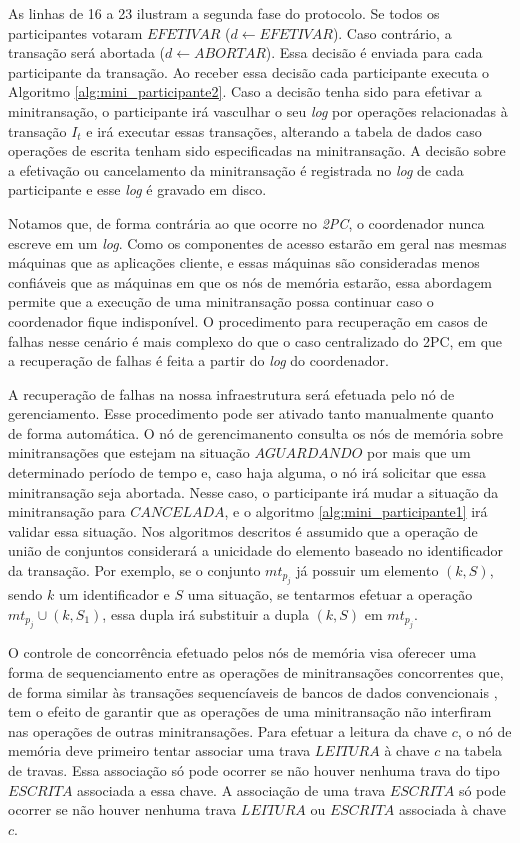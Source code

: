 \documentclass[11pt,twoside,a4paper]{book}
\begin{document}
As linhas de 16 a 23 ilustram a segunda fase do protocolo. Se todos os participantes votaram $EFETIVAR$ ($d \gets EFETIVAR$). Caso contrário, a transação será abortada ($d \gets ABORTAR$). Essa decisão é enviada para cada participante da transação. Ao receber essa decisão cada participante executa o Algoritmo \ref{alg:mini_participante2}. Caso a decisão tenha sido para efetivar a minitransação, o participante irá vasculhar o seu \emph{log} por operações relacionadas à transação $I_t$ e irá executar essas transações, alterando a tabela de dados caso operações de escrita tenham sido especificadas na minitransação. A decisão sobre a efetivação ou cancelamento da minitransação é registrada no \emph{log} de cada participante e esse \emph{log} é gravado em disco.

Notamos que, de forma contrária ao que ocorre no \emph{2PC}, o coordenador nunca escreve em um \emph{log}. Como os componentes de acesso estarão em geral nas mesmas máquinas que as aplicações cliente, e essas máquinas são consideradas menos confiáveis que as máquinas em que os nós de memória estarão, essa abordagem permite que a execução de uma minitransação possa continuar caso o coordenador fique indisponível. O procedimento para recuperação em casos de falhas nesse cenário é mais complexo do que o caso centralizado do 2PC, em que a recuperação de falhas é feita a partir do \emph{log} do coordenador.

A recuperação de falhas na nossa infraestrutura será efetuada pelo nó de gerenciamento. Esse procedimento pode ser ativado tanto manualmente quanto de forma automática. O nó de gerencimanento consulta os nós de memória sobre minitransações que estejam na situação $AGUARDANDO$ por mais que um determinado período de tempo e, caso haja alguma, o nó irá solicitar que essa minitransação seja abortada. Nesse caso, o participante irá mudar a situação da minitransação para $CANCELADA$, e o algoritmo \ref{alg:mini_participante1} irá validar essa situação. Nos algoritmos descritos é assumido que a operação de união de conjuntos considerará a unicidade do elemento baseado no identificador da transação. Por exemplo, se o conjunto $mt_{p_j}$ já possuir um elemento $(k, S)$, sendo $k$ um identificador e $S$ uma situação, se tentarmos efetuar a operação $mt_{p_j} \cup (k, S_1)$, essa dupla irá substituir a dupla $(k,S)$ em $mt_{p_j}$.

O controle de concorrência efetuado pelos nós de memória visa oferecer uma forma de sequenciamento entre as operações de minitransações concorrentes que, de forma similar às transações sequencíaveis de bancos de dados convencionais \cite{vaca}, tem o efeito de garantir que as operações de uma minitransação não interfiram nas operações de outras minitransações. Para efetuar a leitura da chave $c$, o nó de memória deve primeiro tentar associar uma trava $LEITURA$ à chave $c$ na tabela de travas. Essa associação só pode ocorrer se não houver nenhuma trava do tipo $ESCRITA$ associada a essa chave. A associação de uma trava $ESCRITA$ só pode ocorrer se não houver nenhuma trava $LEITURA$ ou $ESCRITA$ associada à chave $c$.
\end{document}

